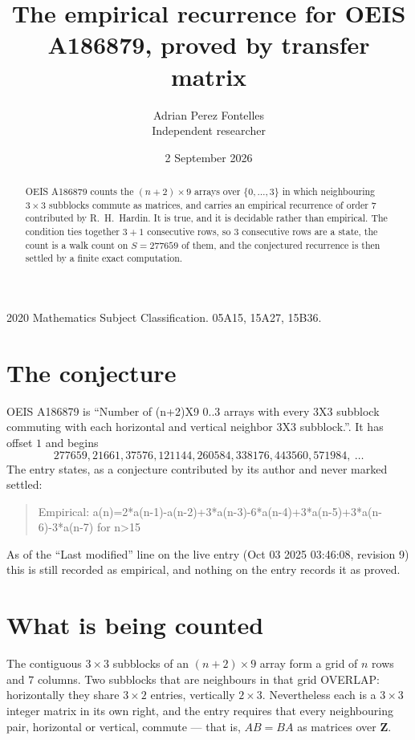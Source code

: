 \documentclass[11pt,a4paper]{article}
\title{The empirical recurrence for OEIS A186879, proved by transfer matrix}
\author{Adrian Perez Fontelles\\ \small Independent researcher}
\date{2 September 2026}
\theoremstyle{plain}
\theoremstyle{definition}
\begin{document}
\maketitle

\begin{abstract}
OEIS A186879 counts the $(n+2)\times9$ arrays over $\{0,\dots,3\}$ in which
neighbouring $3\times3$ subblocks commute as matrices, and carries an empirical
recurrence
of order $7$ contributed by R.~H.~Hardin. It is true, and it is decidable rather than
empirical. The condition ties together $3+1$ consecutive rows, so $3$ consecutive rows are
a state, the count is a walk count on $S=277659$ of them, and the conjectured recurrence is then
settled by a finite exact computation.
\end{abstract}

\noindent\small 2020 Mathematics Subject Classification. 05A15, 15A27, 15B36.\normalsize

\section{The conjecture}

OEIS A186879 is ``Number of (n+2)X9 0..3 arrays with every 3X3 subblock commuting with each horizontal and vertical neighbor 3X3 subblock.''. It has offset $1$ and begins
\[
277659, 21661, 37576, 121144, 260584, 338176, 443560, 571984,\ \dots
\]
The entry states, as a conjecture contributed by its author and never marked settled:
\begin{quote}
Empirical: a(n)=2*a(n-1)-a(n-2)+3*a(n-3)-6*a(n-4)+3*a(n-5)+3*a(n-6)-3*a(n-7) for n>15
\end{quote}
As of the ``Last modified'' line on the live entry (Oct 03 2025 03:46:08, revision 9) this is still
recorded as empirical, and nothing on the entry records it as proved.

\section{What is being counted}

The contiguous $3\times3$ subblocks of an $(n+2)\times9$ array form a grid of $n$
rows and $7$ columns. Two subblocks that are neighbours in that
grid OVERLAP: horizontally they share $3\times2$ entries, vertically
$2\times3$. Nevertheless each is a $3\times3$ integer matrix in its own right, and
the entry requires that every neighbouring pair, horizontal or vertical, commute --- that is,
$AB=BA$ as matrices over $\mathbf{Z}$.
\end{document}
